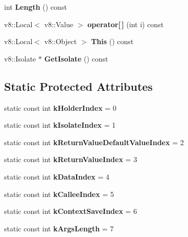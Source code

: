 \begin{DoxyCompactItemize}
int {\bfseries Length} () const
\item 
\mbox{\label{class_function_callback_info_a1e0d0e57964f34fe226aedeb47681cb6}} 
v8\+::\+Local$<$ v8\+::\+Value $>$ {\bfseries operator\mbox{[}$\,$\mbox{]}} (int i) const
\item 
\mbox{\label{class_function_callback_info_add207630ee3270be2d785fb2c79b2c0a}} 
v8\+::\+Local$<$ v8\+::\+Object $>$ {\bfseries This} () const
\item 
\mbox{\label{class_function_callback_info_a8f3fb3e66b3d778b2e92b0aea6cb3e04}} 
v8\+::\+Isolate $\ast$ {\bfseries Get\+Isolate} () const
\end{DoxyCompactItemize}
\subsection*{Static Protected Attributes}
\begin{DoxyCompactItemize}
\item 
\mbox{\label{class_function_callback_info_ad88d04e91a4f436cf34d9991e96ae6d6}} 
static const int {\bfseries k\+Holder\+Index} = 0
\item 
\mbox{\label{class_function_callback_info_ad67c9d59dc70679ac6f70ddf18d9d748}} 
static const int {\bfseries k\+Isolate\+Index} = 1
\item 
\mbox{\label{class_function_callback_info_a43adfdde2702b26dd2bf6f8f9936d097}} 
static const int {\bfseries k\+Return\+Value\+Default\+Value\+Index} = 2
\item 
\mbox{\label{class_function_callback_info_ae8c93c71f3c6dc1d0a01cd150f0bb4d4}} 
static const int {\bfseries k\+Return\+Value\+Index} = 3
\item 
\mbox{\label{class_function_callback_info_afb5dac1e325340aa60f79c78df67377b}} 
static const int {\bfseries k\+Data\+Index} = 4
\item 
\mbox{\label{class_function_callback_info_ae5edf4775e22cd7ed25e7ba160306389}} 
static const int {\bfseries k\+Callee\+Index} = 5
\item 
\mbox{\label{class_function_callback_info_a6b5fb47518a1b59eeb721391f5eee5fa}} 
static const int {\bfseries k\+Context\+Save\+Index} = 6
\item 
\mbox{\label{class_function_callback_info_a50d1542568ecd8e2044c9bce48606ba1}} 
static const int {\bfseries k\+Args\+Length} = 7
\end{DoxyCompactItemize}



